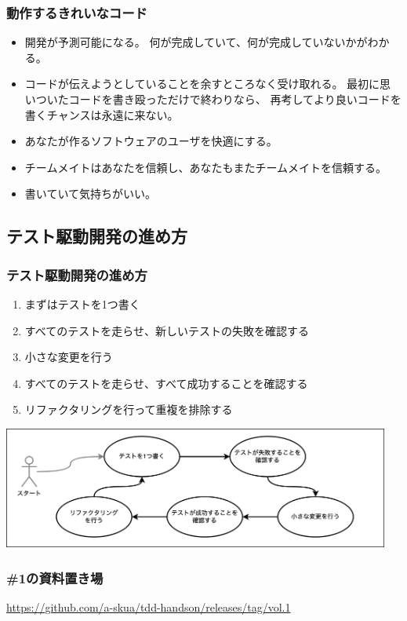 \documentclass[aspectratio=169]{beamer}
\begin{document}
\begin{frame}[fragile]\frametitle{動作するきれいなコード}
  \begin{itemize}
    \item {\color{blue} 開発が予測可能になる。}
      何が完成していて、何が完成していないかがわかる。
    \item {\color{blue} コードが伝えようとしていることを余すところなく受け取れる。}
      最初に思いついたコードを書き殴っただけで終わりなら、
      再考してより良いコードを書くチャンスは永遠に来ない。

    \color{blue}
    \item あなたが作るソフトウェアのユーザを快適にする。
    \item チームメイトはあなたを信頼し、あなたもまたチームメイトを信頼する。
    \item 書いていて気持ちがいい。
  \end{itemize}
\end{frame}

\subsection{テスト駆動開発の進め方}
\begin{frame}\frametitle{テスト駆動開発の進め方}
  \begin{enumerate}
    \item まずはテストを1つ書く
    \item すべてのテストを走らせ、新しいテストの失敗を確認する
    \item 小さな変更を行う
    \item すべてのテストを走らせ、すべて成功することを確認する
    \item リファクタリングを行って重複を排除する
  \end{enumerate}

  \begin{center}
    \includegraphics[height=4cm]{asset/tdd_cycle.png}
  \end{center}
\end{frame}

\begin{frame}\frametitle{\#1の資料置き場}
  \url{https://github.com/a-skua/tdd-handson/releases/tag/vol.1}
\end{frame}
\end{document}
